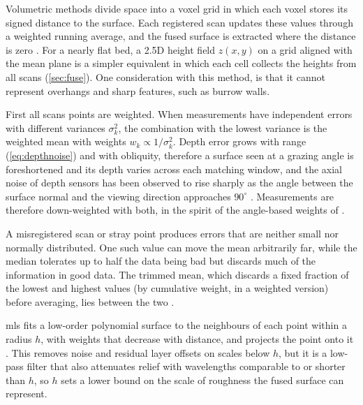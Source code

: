 Volumetric methods divide space into a \gls{voxel} grid in which each voxel stores its signed distance to the surface. Each registered scan updates these values through a weighted running average, and the fused surface is extracted where the distance is zero \cite{curlessVolumetricMethodBuilding1996,newcombeKinectFusionRealtimeDense2011}. For a nearly flat bed, a 2.5D height field $z(x,y)$ on a grid aligned with the mean plane is a simpler equivalent in which each cell collects the heights from all scans (\autoref{sec:fuse}). One consideration with this method, is that it cannot represent overhangs and sharp features, such as burrow walls.

First all scans points are weighted. When measurements have independent errors with different variances $\sigma_k^2$, the combination with the lowest variance is the weighted mean with weights $w_k\propto1/\sigma_k^2$. Depth error grows with range (\autoref{eq:depthnoise}) and with obliquity, therefore a surface seen at a grazing angle is foreshortened and its depth varies across each matching window, and the axial noise of depth sensors has been observed to rise sharply as the angle between the surface normal and the viewing direction approaches $90^\circ$ \cite{nguyenModelingKinectSensor2012}. Measurements are therefore down-weighted with both, in the spirit of the angle-based weights of \cite{curlessVolumetricMethodBuilding1996}.

A misregistered scan or stray point produces errors that are neither small nor normally distributed. One such value can move the mean arbitrarily far, while the median tolerates up to half the data being bad but discards much of the information in good data. The trimmed mean, which discards a fixed fraction of the lowest and highest values (by cumulative weight, in a weighted version) before averaging, lies between the two \cite{huberRobustStatistics2011}.

\gls{mls} fits a low-order polynomial surface to the neighbours of each point within a radius $h$, with weights that decrease with distance, and projects the point onto it \cite{levin1998approximation, alexaComputingRenderingPoint2003}. This removes noise and residual layer offsets on scales below $h$, but it is a low-pass filter that also attenuates relief with wavelengths comparable to or shorter than $h$, so $h$ sets a lower bound on the scale of roughness the fused surface can represent.


